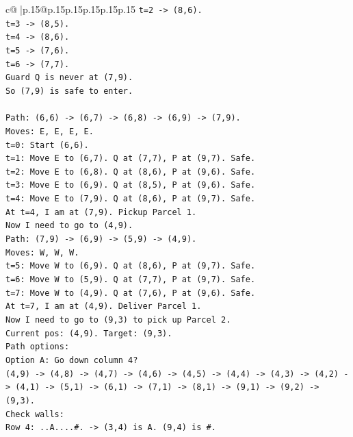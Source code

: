\documentclass{article}
\begin{document}
{\begin{supertabular}{c@{$\;$}|p{.15\linewidth}@{}p{.15\linewidth}p{.15\linewidth}p{.15\linewidth}p{.15\linewidth}p{.15\linewidth}}
{{{\texttt{t=2 {-}> (8,6).} \\
\texttt{t=3 {-}> (8,5).} \\
\texttt{t=4 {-}> (8,6).} \\
\texttt{t=5 {-}> (7,6).} \\
\texttt{t=6 {-}> (7,7).} \\
\texttt{Guard Q is never at (7,9).} \\
\texttt{So (7,9) is safe to enter.} \\
\\ 
\texttt{Path: (6,6) {-}> (6,7) {-}> (6,8) {-}> (6,9) {-}> (7,9).} \\
\texttt{Moves: E, E, E, E.} \\
\texttt{t=0: Start (6,6).} \\
\texttt{t=1: Move E to (6,7). Q at (7,7), P at (9,7). Safe.} \\
\texttt{t=2: Move E to (6,8). Q at (8,6), P at (9,6). Safe.} \\
\texttt{t=3: Move E to (6,9). Q at (8,5), P at (9,6). Safe.} \\
\texttt{t=4: Move E to (7,9). Q at (8,6), P at (9,7). Safe.} \\
\texttt{At t=4, I am at (7,9). Pickup Parcel 1.} \\
\texttt{Now I need to go to (4,9).} \\
\texttt{Path: (7,9) {-}> (6,9) {-}> (5,9) {-}> (4,9).} \\
\texttt{Moves: W, W, W.} \\
\texttt{t=5: Move W to (6,9). Q at (8,6), P at (9,7). Safe.} \\
\texttt{t=6: Move W to (5,9). Q at (7,7), P at (9,7). Safe.} \\
\texttt{t=7: Move W to (4,9). Q at (7,6), P at (9,6). Safe.} \\
\texttt{At t=7, I am at (4,9). Deliver Parcel 1.} \\
\texttt{Now I need to go to (9,3) to pick up Parcel 2.} \\
\texttt{Current pos: (4,9). Target: (9,3).} \\
\texttt{Path options:} \\
\texttt{Option A: Go down column 4?} \\
\texttt{(4,9) {-}> (4,8) {-}> (4,7) {-}> (4,6) {-}> (4,5) {-}> (4,4) {-}> (4,3) {-}> (4,2) {-}> (4,1) {-}> (5,1) {-}> (6,1) {-}> (7,1) {-}> (8,1) {-}> (9,1) {-}> (9,2) {-}> (9,3).} \\
\texttt{Check walls:} \\
\texttt{Row 4: ..A....\#. {-}> (3,4) is A. (9,4) is \#.} \\
}}}
\end{supertabular}}
\end{document}

